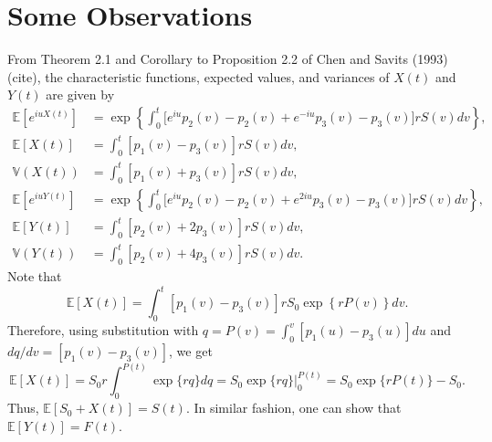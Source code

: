 \documentclass[10pt]{article}
\newcommand{\Var}{\mathbb{V}}
\newcommand{\EE}{\mathbb{E}}
\begin{document}
\section{Some Observations}

From Theorem 2.1 and Corollary to Proposition 2.2 of Chen and Savits (1993) (cite), the characteristic functions, expected values, and variances of $X(t)$ and $Y(t)$ are
given by
\begin{equation}\label{Chen*Savits*formulas}
\begin{split}
\EE[e^{iuX(t)}] &= \exp \left\{ \int_0^t \Big[ e^{iu}p_2(v)-p_2(v) + e^{-iu}p_3(v) - p_3(v) \Big] r S(v) dv\right\},\\
\EE[X(t)] &= \int_0^t [p_1(v) - p_3(v)] r S(v) dv,\\
\Var(X(t)) &= \int_0^t [p_1(v) + p_3(v)] r S(v) dv, \\
\EE[e^{iuY(t)}] &= \exp \left\{ \int_0^t \Big[ e^{iu}p_2(v)-p_2(v) + e^{2iu}p_3(v) - p_3(v) \Big] r S(v) dv\right\},\\
\EE[Y(t)] &= \int_0^t [p_2(v) + 2p_3(v)] r S(v) dv,\\
\Var(Y(t)) &= \int_0^t [p_2(v) + 4p_3(v)] r S(v) dv.
\end{split}
\end{equation}
Note that
\begin{equation*}
\EE[X(t)] = \int_0^t [p_1(v) - p_3(v)]   r   S_0 \exp \left\{ r P(v) \right\} dv.
\end{equation*}
Therefore, using substitution with $q = P(v) = \int_0^v [p_1(u) - p_3(u)] du$ and $dq/dv = [p_1(v) - p_3(v)]$, we get
\begin{equation*}
\EE[X(t)] = S_0 r \int_0^{P(t)} \exp\{rq\}dq = S_0 \exp \{rq\} \Big \vert_0^{P(t)} = S_0 \exp\{r P(t)\} - S_0.
\end{equation*}
Thus, $\EE[S_0+X(t)] = S(t)$. In similar fashion, one can show that $\EE[Y(t)]=F(t)$.
\end{document}
